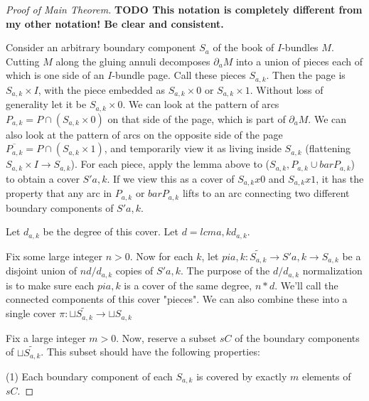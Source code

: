 \documentclass[12pt]{amsart}
\theoremstyle{definition}
\theoremstyle{remark}
\newcommand{\bd}{\partial}
\begin{document}
\begin{proof}[Proof of Main Theorem]


{\bf TODO This notation is completely different from my other notation! Be
clear and consistent.}

Consider an arbitrary boundary component $S_a$ of the book of $I$-bundles $M$.
Cutting $M$ along the gluing annuli decomposes $\bd_aM$ into a union of pieces
each of which is one side of an $I$-bundle page. Call these pieces $S_{a,k}$.
Then the page is $S_{a,k}\times I$, with the piece embedded as $S_{a,k}\times
0$ or $S_{a,k}\times 1$. Without loss of generality let it be $S_{a,k}\times
0$. We can look at the pattern of arcs $P_{a,k} = P \cap (S_{a,k}\times 0)$ on
that side of the page, which is part of $\bd_aM$. We can also look at the pattern
of arcs on the opposite side of the page $\overline{P_{a,k}} = P \cap
(S_{a,k}\times 1)$, and temporarily view it as living inside $S_{a,k}$
(flattening $S_{a,k}\times I \to S_{a,k}$).  For each piece, apply the lemma
above to ($S_{a,k},P_{a,k} \cup barP_{a,k}$) to obtain a cover $S'a,k$. If we
view this as a cover of $S_{a,k}x0$ and $S_{a,k}x1$, it has the property that
any arc in $P_{a,k}$ or $barP_{a,k}$ lifts to an arc connecting two different
boundary components of $S'a,k$.

Let $d_{a,k}$ be the degree of this cover. Let $d = lcm a,k d_{a,k}$.

Fix some large integer $n>0$. Now for each $k$, let $pia,k
\colon \widetilde{S_{a,k}} \to S'a,k \to S_{a,k}$ be a disjoint union of $nd/d_{a,k}$
copies of $S'a,k$. The purpose of the $d/d_{a,k}$ normalization is to make sure
each $pia,k$ is a cover of the same degree, $n*d$.  We'll call the connected
components of this cover "pieces". We can also combine these into a single
cover $\pi \colon \sqcup \widetilde{S_{a,k}} \to \sqcup S_{a,k}$

Fix a large integer $m>0$. Now, reserve a subset $sC$ of the boundary
components of $\sqcup \widetilde{S_{a,k}}$.  This subset should have the following
properties:

(1) Each boundary component of each $S_{a,k}$ is covered by exactly $m$ elements
of $sC$.


\end{proof}
\end{document}
